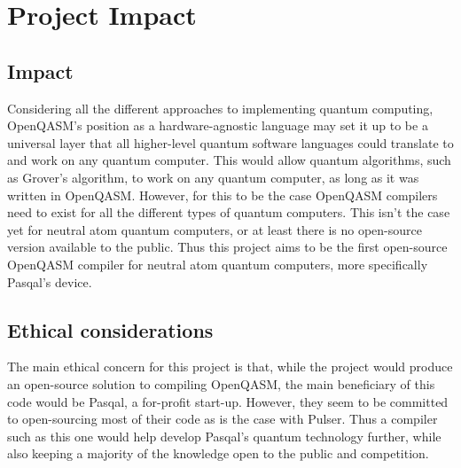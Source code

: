 \section{Project Impact}
\label{sec:impact}

\subsection{Impact}
\label{sec:Impact}
Considering all the different approaches to implementing quantum computing, OpenQASM's position as a hardware-agnostic language may set it up to be
 a universal layer that all higher-level quantum software languages could translate to and work on any quantum computer. This would allow quantum algorithms, such as 
 Grover's algorithm, to work on any quantum computer, as long as it was written in OpenQASM. However, for this to be the case OpenQASM compilers need to exist for all 
 the different types of quantum computers. This isn't the case yet for neutral atom quantum computers, or at least there is no open-source version available to the public.
 Thus this project aims to be the first open-source OpenQASM compiler for neutral atom quantum computers, more specifically Pasqal's device.

\subsection{Ethical considerations}
\label{sec:Impactethics}
The main ethical concern for this project is that, while the project would produce an open-source solution to compiling OpenQASM, the main beneficiary of this code would
be Pasqal, a for-profit start-up. However, they seem to be committed to open-sourcing most of their code as is the case with Pulser. Thus a compiler such as this one would
help develop Pasqal's quantum technology further, while also keeping a majority of the knowledge open to the public and competition.